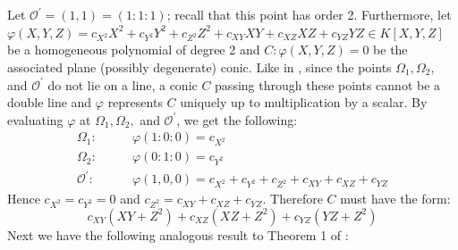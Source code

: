 Let $\mathcal{O}^\prime = (1, 1) = (1 : 1 : 1)$; recall that this point has
    order 2.
Furthermore, let $\varphi(X, Y, Z) = c_{X^2}X^2 + c_{Y^2}Y^2 + c_{Z^2}Z^2 +
    c_{XY}XY + c_{XZ}XZ + c_{YZ}YZ \in K[X, Y, Z]$ be a homogeneous polynomial
    of degree 2 and $C: \varphi(X, Y, Z) = 0$ be the associated plane (possibly
    degenerate) conic.
Like in \cite{arene2011faster}, since the points $\Omega_1, \Omega_2,$ and
    $\mathcal{O}^\prime$ do not lie on a line, a conic $C$ passing through
    these points cannot be a double line and $\varphi$ represents $C$ uniquely
    up to multiplication by a scalar.
By evaluating $\varphi$ at $\Omega_1, \Omega_2,$ and $\mathcal{O}^\prime$, we
    get the following:
\begin{align*}
\Omega_1:\qquad &\varphi(1 : 0 : 0) = c_{X^2}\\
\Omega_2:\qquad &\varphi(0 : 1 : 0) = c_{Y^2}\\
\mathcal{O}^\prime:\qquad&\varphi(1, 0, 0) = c_{X^2} + c_{Y^2} + c_{Z^2} +
                                             c_{XY} + c_{XZ} + c_{YZ}
\end{align*}
Hence $c_{X^2} = c_{Y^2} = 0$ and $c_{Z^2} = c_{XY} + c_{XZ} + c_{YZ}$.
Therefore $C$ must have the form:
\begin{equation}\label{eq_C}
c_{XY}(XY + Z^2) + c_{XZ}(XZ + Z^2) + c_{YZ}(YZ + Z^2)
\end{equation}
Next we have the following analogous result to Theorem 1 of
    \cite{arene2011faster}:

